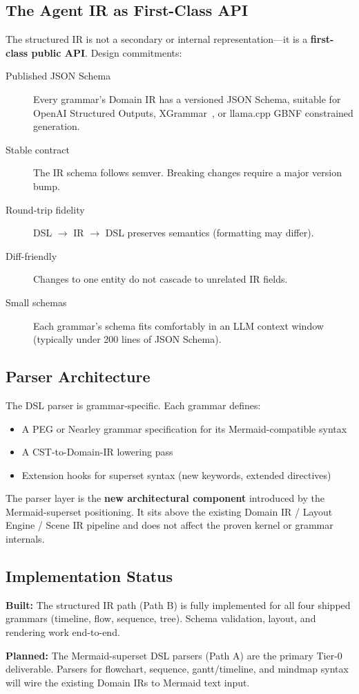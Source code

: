 \subsection{The Agent IR as First-Class API}

The structured IR is not a secondary or internal representation---it is a \textbf{first-class
public API}. Design commitments:

\begin{description}
  \item[Published JSON Schema] Every grammar's Domain IR has a versioned JSON Schema,
        suitable for OpenAI Structured Outputs, XGrammar~\cite{dong2024xgrammar},
        or llama.cpp GBNF constrained generation.
  \item[Stable contract] The IR schema follows semver. Breaking changes require a major version bump.
  \item[Round-trip fidelity] DSL $\to$ IR $\to$ DSL preserves semantics (formatting may differ).
  \item[Diff-friendly] Changes to one entity do not cascade to unrelated IR fields.
  \item[Small schemas] Each grammar's schema fits comfortably in an LLM context window
        (typically under 200 lines of JSON Schema).
\end{description}

\subsection{Parser Architecture}

The DSL parser is grammar-specific. Each grammar defines:
\begin{itemize}
  \item A PEG or Nearley grammar specification for its Mermaid-compatible syntax
  \item A CST-to-Domain-IR lowering pass
  \item Extension hooks for superset syntax (new keywords, extended directives)
\end{itemize}

The parser layer is the \textbf{new architectural component} introduced by the Mermaid-superset
positioning. It sits above the existing Domain IR / Layout Engine / Scene IR pipeline and does
not affect the proven kernel or grammar internals.

\subsection{Implementation Status}

\textbf{Built:} The structured IR path (Path B) is fully implemented for all four shipped
grammars (timeline, flow, sequence, tree). Schema validation, layout, and rendering work
end-to-end.

\textbf{Planned:} The Mermaid-superset DSL parsers (Path A) are the primary Tier-0 deliverable.
Parsers for flowchart, sequence, gantt/timeline, and mindmap syntax will wire the existing
Domain IRs to Mermaid text input.
